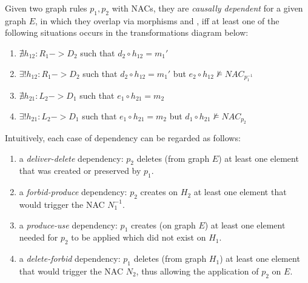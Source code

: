 \begin{definition}\label{def:classic-dependency} Given two graph rules $p_1,p_2$ with NACs, they are \emph{causally dependent} for a given graph $E$, in which they overlap via morphisms  and , iff at least one of the following situations occurs in the transformations diagram below:

  \begin{enumerate}
    \item $\nexists h_{12} : R_1 -> D_2$ such that $d_2 \circ h_{12} = m_1'$
    \item $\exists! h_{12} : R_1 -> D_2$ such that $d_2 \circ h_{12} = m_1'$ but $e_2 \circ h_{12} \not\models NAC_{p_1^{-1}}$
    \item $\nexists h_{21} : L_2 -> D_1$ such that $e_1 \circ h_{21} = m_2$
    \item $\exists! h_{21} : L_2 -> D_1$ such that $e_1 \circ h_{21} = m_2$ but $d_1 \circ h_{21} \not\models NAC_{p_2}$
  \end{enumerate}

\end{definition}

Intuitively, each case of dependency can be regarded as follows:

\begin{enumerate}
  \item a \emph{deliver-delete} dependency: $p_2$ deletes (from graph $E$) at least one element that was created or preserved by $p_1$.
  \item a \emph{forbid-produce} dependency: $p_2$ creates on $H_2$ at least one element that would trigger the NAC $N_1^{-1}$.
  \item a \emph{produce-use} dependency: $p_1$ creates (on graph $E$) at least one element needed for $p_2$ to be applied which did not exist on $H_1$.
  \item a \emph{delete-forbid} dependency: $p_1$ deletes (from graph $H_1$) at least one element that would trigger the NAC $N_2$, thus allowing the application of $p_2$ on $E$.
\end{enumerate}

